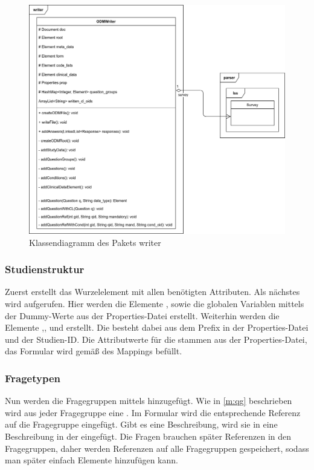 \begin{figure}[h]
			\centering
			\includegraphics[width=.98\textwidth]{./img/cls_writer.png}
			\caption{Klassendiagramm des Pakets writer}
\end{figure}

\subsubsection{Studienstruktur}

Zuerst erstellt  das Wurzelelement  mit allen benötigten Attributen.
Als nächstes wird  aufgerufen. Hier werden die Elemente , sowie die globalen Variablen mittels der Dummy-Werte aus der Properties-Datei erstellt.
Weiterhin werden die Elemente ,,  und  erstellt.
Die  besteht dabei aus dem Prefix in der Properties-Datei und der Studien-ID.
Die Attributwerte für die  stammen aus der Properties-Datei, das Formular wird gemäß des Mappings befüllt.

\subsubsection{Fragetypen}

Nun werden die Fragegruppen mittels  hinzugefügt. Wie in \cref{m:qg} beschrieben wird aus jeder Fragegruppe eine .
Im Formular wird die entsprechende Referenz auf die Fragegruppe eingefügt.
Gibt es eine Beschreibung, wird sie in eine Beschreibung in der  eingefügt.
Die Fragen brauchen später Referenzen in den Fragegruppen, daher werden Referenzen auf alle Fragegruppen gespeichert, sodass man später einfach Elemente hinzufügen kann.

